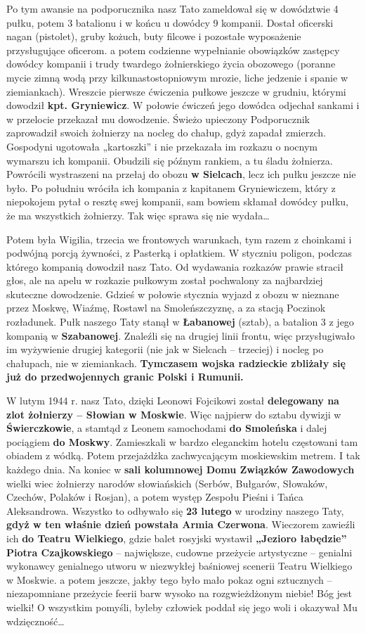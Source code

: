 Po tym awansie na podporucznika nasz Tato zameldował się w dowództwie 4 pułku, potem 3 batalionu i w końcu u dowódcy 9 kompanii. Dostał oficerski nagan (pistolet), gruby kożuch, buty filcowe i pozostałe wyposażenie przysługujące oficerom. a potem codzienne wypełnianie obowiązków zastępcy dowódcy kompanii i trudy twardego żołnierskiego życia obozowego (poranne mycie zimną wodą przy kilkunastostopniowym mrozie, liche jedzenie i spanie w ziemiankach). Wreszcie pierwsze ćwiczenia pułkowe jeszcze w grudniu, którymi dowodził \textbf{kpt. Gryniewicz}. W połowie ćwiczeń jego dowódca odjechał sankami i w przelocie przekazał mu dowodzenie. Świeżo upieczony Podporucznik zaprowadził swoich żołnierzy na nocleg do chałup, gdyż zapadał zmierzch. Gospodyni ugotowała „kartoszki” i nie przekazała im rozkazu o nocnym wymarszu ich kompanii. Obudzili się późnym rankiem, a tu śladu żołnierza. Powrócili wystraszeni na przełaj do obozu \textbf{w Sielcach}, lecz ich pułku jeszcze nie było. Po południu wróciła ich kompania z kapitanem Gryniewiczem, który z niepokojem pytał o resztę swej kompanii, sam bowiem skłamał dowódcy pułku, że ma wszystkich żołnierzy. Tak więc sprawa się nie wydała…

Potem była Wigilia, trzecia we frontowych warunkach, tym razem z choinkami i podwójną porcją żywności, z Pasterką i opłatkiem. W styczniu poligon, podczas którego kompanią dowodził nasz Tato. Od wydawania rozkazów prawie stracił głos, ale na apelu w rozkazie pułkowym został pochwalony za najbardziej skuteczne dowodzenie. Gdzieś w połowie stycznia wyjazd z obozu w nieznane przez Moskwę, Wiaźmę, Rostawl na Smoleńszczyznę, a za stacją Poczinok rozładunek. Pułk naszego Taty stanął w \textbf{Łabanowej} (sztab), a batalion 3 z jego kompanią w \textbf{Szabanowej}. Znaleźli się na drugiej linii frontu, więc przysługiwało im wyżywienie drugiej kategorii (nie jak w Sielcach -- trzeciej) i nocleg po chałupach, nie w ziemiankach. \textbf{Tymczasem wojska radzieckie zbliżały się już do przedwojennych granic Polski i Rumunii.}

W lutym 1944 r. nasz Tato, dzięki Leonowi Fojcikowi został \textbf{delegowany na zlot żołnierzy -- Słowian w Moskwie}. Więc najpierw do sztabu dywizji w \textbf{Świerczkowie}, a stamtąd z Leonem samochodami \textbf{do Smoleńska} i dalej pociągiem \textbf{do Moskwy}. Zamieszkali w bardzo eleganckim hotelu częstowani tam obiadem z wódką. Potem przejażdżka zachwycającym moskiewskim metrem. I tak każdego dnia. Na koniec w \textbf{sali kolumnowej Domu Związków Zawodowych} wielki wiec żołnierzy narodów słowiańskich (Serbów, Bułgarów, Słowaków, Czechów, Polaków i Rosjan), a potem występ Zespołu Pieśni i Tańca Aleksandrowa. Wszystko to odbywało się \textbf{23 lutego} w urodziny naszego Taty, \textbf{gdyż w ten właśnie dzień powstała Armia Czerwona}. Wieczorem zawieźli ich \textbf{do Teatru Wielkiego}, gdzie balet rosyjski wystawił \textbf{„Jezioro łabędzie” Piotra Czajkowskiego} -- największe, cudowne przeżycie artystyczne -- genialni wykonawcy genialnego utworu w niezwykłej baśniowej scenerii Teatru Wielkiego w Moskwie. a potem jeszcze, jakby tego było mało pokaz ogni sztucznych – niezapomniane przeżycie feerii barw wysoko na rozgwieżdżonym niebie! Bóg jest wielki! O wszystkim pomyśli, byleby człowiek poddał się jego woli i okazywał Mu wdzięczność…

